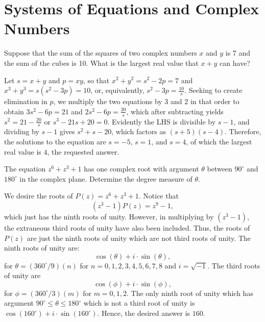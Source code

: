 \documentclass[11pt]{article}
\theoremstyle{definition}
\begin{document}
\tableofcontents


\newpage


\section{Systems of Equations and Complex Numbers}



\begin{question}[name={1983 AIME, \href{https://artofproblemsolving.com/community/c4p367523}{Problem 5}}]
	Suppose that the sum of the squares of two complex numbers $x$ and $y$ is 7 and the sum of the cubes is 10. What is the largest real value that $x + y$ can have?	
\end{question}


\begin{solution}[name={Solution by peace09}]
	Let $s=x+y$ and $p=xy$, so that $x^2+y^2=s^2-2p=7$ and $x^3+y^3=s(s^2-3p)=10$, or, equivalently, $s^2-3p=\tfrac{10}{s}$. Seeking to create elimination in $p$, we multiply the two equations by $3$ and $2$ in that order to obtain $3s^2-6p=21$ and $2s^2-6p=\tfrac{20}{s}$, which after subtracting yields $s^2=21-\tfrac{20}{s}$ or $s^3-21s+20=0$. Evidently the LHS is divisible by $s-1$, and dividing by $s-1$ gives $s^2+s-20$, which factors as $(s+5)(s-4)$. Therefore, the solutions to the equation are $s=-5$, $s=1$, and $s=4$, of which the largest real value is $\boxed{4}$, the requested answer.
\end{solution}




\begin{question}[name={1984 AIME, \href{https://artofproblemsolving.com/community/c4h66510p392620}{Problem 8}}]
	The equation $z^6 + z^3 + 1$ has one complex root with argument $\theta$ between $90^\circ$ and $180^\circ$ in the complex plane. Determine the degree measure of $\theta$.
\end{question}

\begin{solution}[name={Solution by S. Zhu}]
	We desire the roots of $P(z)=z^6+z^3+1$. Notice that\[ (z^3-1)P(z)=z^9-1, \]which just has the ninth roots of unity. However, in multiplying by $(z^3-1)$, the extraneous third roots of unity have also been included. Thus, the roots of $P(z)$ are just the ninth roots of unity which are not third roots of unity. The ninth roots of unity are:\[ \cos(\theta)+i\cdot\sin(\theta), \]for $\theta=\left({360^\circ}/{9}\right)(n)$ for $n=0,1,2,3,4,5,6,7,8$ and $i=\sqrt{-1}$.
	The third roots of unity are\[ \cos(\phi)+i\cdot\sin(\phi), \]for $\phi=\left({360^\circ}/{3}\right)(m)$ for $m=0,1,2$. The only ninth root of unity which has argument $90^\circ\le\theta\le180^\circ$ which is not a third root of unity is $\cos(160^\circ)+i\cdot\sin(160^\circ)$. Hence, the desired answer is $\boxed{160}$.
\end{solution}
\end{document}
